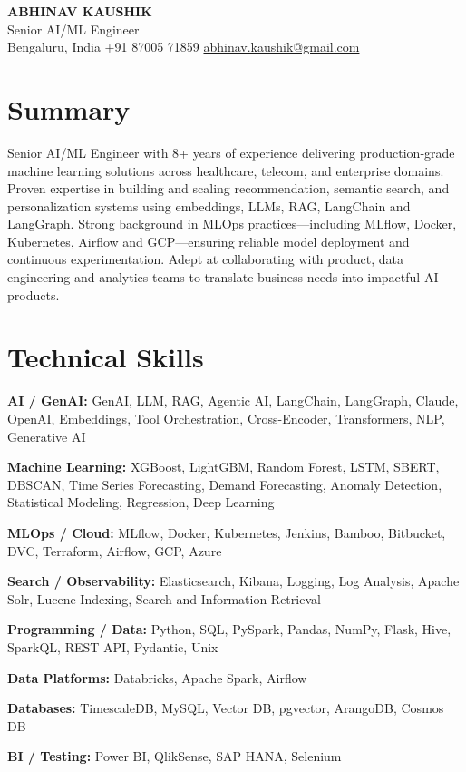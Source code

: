 \documentclass[10pt,a4paper]{article}
\begin{document}
\begin{center}
  {\LARGE\bfseries ABHINAV KAUSHIK}\\[2pt]
  {\large Senior AI/ML Engineer}\\[2pt]
  Bengaluru, India \textbar{} +91 87005 71859 \textbar{} \href{mailto:abhinav.kaushik@gmail.com}{abhinav.kaushik@gmail.com}
\end{center}

\section{Summary}
Senior AI/ML Engineer with 8+ years of experience delivering production‑grade machine learning solutions across healthcare, telecom, and enterprise domains. Proven expertise in building and scaling recommendation, semantic search, and personalization systems using embeddings, LLMs, RAG, LangChain and LangGraph. Strong background in MLOps practices—including MLflow, Docker, Kubernetes, Airflow and GCP—ensuring reliable model deployment and continuous experimentation. Adept at collaborating with product, data engineering and analytics teams to translate business needs into impactful AI products.

\section{Technical Skills}
\textbf{AI / GenAI:} GenAI, LLM, RAG, Agentic AI, LangChain, LangGraph, Claude, OpenAI, Embeddings, Tool Orchestration, Cross-Encoder, Transformers, NLP, Generative AI\par
\textbf{Machine Learning:} XGBoost, LightGBM, Random Forest, LSTM, SBERT, DBSCAN, Time Series Forecasting, Demand Forecasting, Anomaly Detection, Statistical Modeling, Regression, Deep Learning\par
\textbf{MLOps / Cloud:} MLflow, Docker, Kubernetes, Jenkins, Bamboo, Bitbucket, DVC, Terraform, Airflow, GCP, Azure\par
\textbf{Search / Observability:} Elasticsearch, Kibana, Logging, Log Analysis, Apache Solr, Lucene Indexing, Search and Information Retrieval\par
\textbf{Programming / Data:} Python, SQL, PySpark, Pandas, NumPy, Flask, Hive, SparkQL, REST API, Pydantic, Unix\par
\textbf{Data Platforms:} Databricks, Apache Spark, Airflow\par
\textbf{Databases:} TimescaleDB, MySQL, Vector DB, pgvector, ArangoDB, Cosmos DB\par
\textbf{BI / Testing:} Power BI, QlikSense, SAP HANA, Selenium\par
\end{document}
